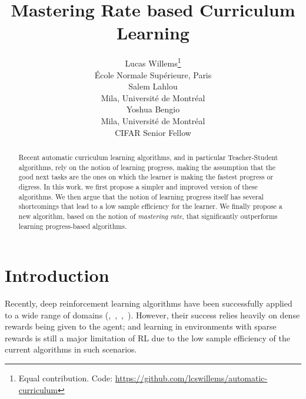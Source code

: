 \documentclass{article}
\title{Mastering Rate based Curriculum Learning}
\author{Lucas Willems\thanks{Equal contribution. Code: \url{https://github.com/lcswillems/automatic-curriculum}} \\
\'Ecole Normale Sup\'erieure, Paris \\
\And
Salem Lahlou\footnotemark[1] \\
Mila, Universit\'e de Montr\'eal \\
\And
Yoshua Bengio \\
Mila, Universit\'e de Montr\'eal \\
CIFAR Senior Fellow}
\begin{document}
\maketitle



\begin{abstract}
Recent automatic curriculum learning algorithms, and in particular Teacher-Student algorithms, rely on the notion of learning progress, making the assumption that the good next tasks are the ones on which the learner is making the fastest progress or digress. In this work, we first propose a simpler and improved version of these algorithms. We then argue that the notion of learning progress itself has several shortcomings that lead to a low sample efficiency for the learner. We finally propose a new algorithm, based on the notion of \textit{mastering rate}, that significantly outperforms learning progress-based algorithms.
\end{abstract}



\section{Introduction}

Recently, deep reinforcement learning algorithms have been successfully applied to a wide range of domains (\citep{mnih2015human},~\citep{schulman2017proximal},~\citep{hessel2018rainbow},~\citep{singh2019end}). However, their success relies heavily on dense rewards being given to the agent; and learning in environments with sparse rewards is still a major limitation of RL due to the low sample efficiency of the current algorithms in such scenarios.
\end{document}
